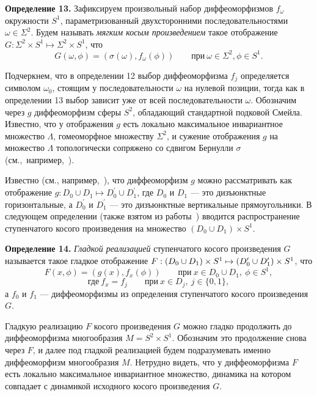 \documentclass[12pt]{article}
\begin{document}
\textbf{Определение 13.} Зафиксируем произвольный набор диффеоморфизмов $f_{\omega}$ окружности $S^1$, параметризованный двухсторонними последовательностями $\omega\in\Sigma^2$. Будем называть \textit{мягким косым произведением} такое отображение $G:\Sigma^2\times S^1\mapsto\Sigma^2\times S^1$, что
$$G(\omega,\phi)=(\sigma(\omega), f_{\omega}(\phi))\qquad\mbox{при}\ \omega\in\Sigma^2,\phi\in S^1.$$

Подчеркнем, что в определении 12 выбор диффеоморфизма $f_j$ определяется символом $\omega_0$, стоящим у последовательности $\omega$ на нулевой позиции, тогда как в определении 13 выбор зависит уже от всей последовательности $\omega$. 
Обозначим через $g$ диффеоморфизм сферы $S^2$, обладающий стандартной подковой Смейла.
Известно, что у отображения $g$ есть локально максимальное инвариантное множество $\Lambda$, гомеоморфное множеству $\Sigma^2$, и сужение отображения $g$ на множество $\Lambda$ топологически сопряжено со сдвигом Бернулли $\sigma$ (см.,~например,~\cite{16}).

Известно (см., например,~\cite{15}), что диффеоморфизм $g$ можно рассматривать как отображение $g:D_0\cup D_1\mapsto D^\prime_0\cup D^\prime_1$, где $D_0$ и $D_1$ --- это дизъюнктные горизонтальные, а $D^\prime_0$  и $D^\prime_1$ --- это дизъюнктные вертикальные прямоугольники. В следующем определении (также взятом из работы~\cite{15}) вводится распространение ступенчатого косого произведения на множество $(D_0\cup D_1)\times S^1$.

\textbf{Определение 14.} \textit{Гладкой реализацией} ступенчатого косого произведения $G$ называется такое гладкое отображение $F:(D_0\cup D_1)\times S^1\mapsto\allowbreak(D^{\prime}_0\nobreak\cup\nobreak D^{\prime}_1)\nobreak\times\nobreak S^1$, что
$$F(x,\phi)=(g(x),f_{x}(\phi))\qquad\mbox{при}\ x\in D_0\cup D_1,\ \phi\in S^1,$$
$$\mbox{где}\ f_{x}=f_j\qquad\mbox{при}\ x\in D_j,\ j\in\{0,1\},$$
а $f_0$ и $f_1$ --- диффеоморфизмы из определения ступенчатого косого произведения $G$.

Гладкую реализацию $F$ косого произведения $G$ можно гладко продолжить до диффеоморфизма многообразия $M=S^2\times S^1$. Обозначим это продолжение снова через $F$, и далее под гладкой реализацией будем подразумевать именно диффеоморфизм многообразия $M$. Нетрудно видеть, что у диффеоморфизма $F$ есть локально максимальное инвариантное множество, динамика на котором совпадает с динамикой исходного косого произведения $G$.
\end{document}
